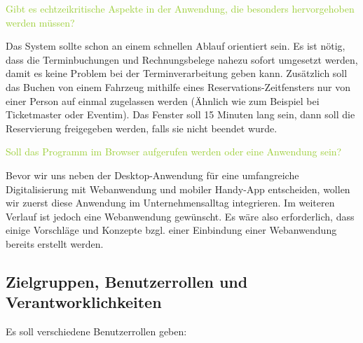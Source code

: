 \textcolor{YellowGreen}{Gibt es echtzeikritische Aspekte in der Anwendung, die besonders hervorgehoben werden müssen?}

\textcolor{NavyBlue}{Das System sollte schon an einem schnellen Ablauf orientiert sein. Es ist nötig, dass die Terminbuchungen und Rechnungsbelege nahezu sofort umgesetzt werden, damit es keine Problem bei der Terminverarbeitung geben kann. Zusätzlich soll das Buchen von einem Fahrzeug mithilfe eines Reservations-Zeitfensters nur von einer Person auf einmal zugelassen werden (Ähnlich wie zum Beispiel bei Ticketmaster oder Eventim). Das Fenster soll 15 Minuten lang sein, dann soll die Reservierung freigegeben werden, falls sie nicht beendet wurde. }

\textcolor{YellowGreen}{Soll das Programm im Browser aufgerufen werden oder eine Anwendung sein?}

\textcolor{NavyBlue}{Bevor wir uns neben der Desktop-Anwendung für eine umfangreiche Digitalisierung mit Webanwendung und mobiler Handy-App entscheiden, wollen wir zuerst diese Anwendung im Unternehmensalltag integrieren. Im weiteren Verlauf ist jedoch eine Webanwendung gewünscht. Es wäre also erforderlich, dass einige Vorschläge und Konzepte bzgl. einer Einbindung einer Webanwendung bereits erstellt werden.}

\subsection{Zielgruppen, Benutzerrollen und Verantworklichkeiten}

Es soll verschiedene Benutzerrollen geben: 

